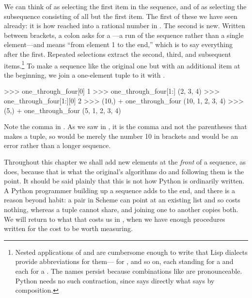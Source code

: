 \noindent
We can think of \code{[0]} as selecting the first item in the sequence, and of
\code{[1:]} as selecting the subsequence consisting of all but the first item.
The first of these we have seen already: it is how  reached into a
rational number in .  The second is new.  Written between
brackets, a colon asks for a ---a run of the sequence rather
than a single element---and \code{[1:]} means ``from element 1 to the end,''
which is to say everything after the first.  Repeated selections extract the
second, third, and subsequent items.\footnote{Nested applications of 
and  are cumbersome enough to write that Lisp dialects provide
abbreviations for them--- for , and so on, each  standing for a  and each
 for a .  The names persist because combinations like
 are pronounceable.  Python needs no such contraction, since
 says directly what  says by composition.}
To make a sequence like the original one but with an additional item at the
beginning, we join a one-element tuple to it with \code{+}.

\begin{codeBlock}
>>> one_through_four[0]
1
>>> one_through_four[1:]
(2, 3, 4)
>>> one_through_four[1:][0]
2
>>> (10,) + one_through_four
(10, 1, 2, 3, 4)
>>> (5,) + one_through_four
(5, 1, 2, 3, 4)
\end{codeBlock}

\noindent
Note the comma in .  As we saw in , it is the
comma and not the parentheses that makes a tuple, so  would be
merely the number 10 in brackets and  would be
an error rather than a longer sequence.

\begin{notTaste}
Throughout this chapter we shall add new elements at the \emph{front} of a
sequence, as  does, because that is what the
original's algorithms do and following them is the point.  It should be said
plainly that this is not how Python is ordinarily written.  A Python programmer
building up a sequence adds to the end, and there is a reason beyond habit: a
pair in Scheme can point at an existing list and so  costs nothing,
whereas a tuple cannot share, and joining one to another copies both.  We will
return to what that costs us in , when we have enough
procedures written for the cost to be worth measuring.
\end{notTaste}


